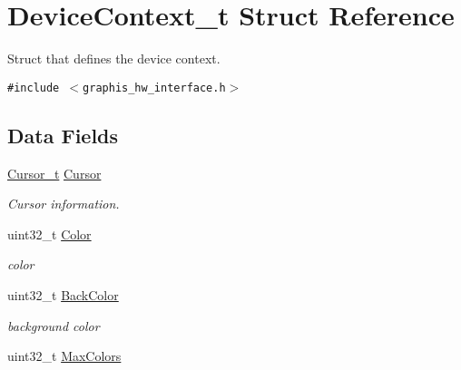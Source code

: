 \hypertarget{struct_device_context__t}{
\section{DeviceContext\_\-t Struct Reference}
\label{struct_device_context__t}
}
Struct that defines the device context.  


{\tt \#include $<$graphis\_\-hw\_\-interface.h$>$}

\subsection*{Data Fields}
\begin{CompactItemize}
\item 
\hypertarget{struct_device_context__t_8ebbb5616f53fe78cb656b842b251d3e}{
\hyperlink{struct_cursor__t}{Cursor\_\-t} \hyperlink{struct_device_context__t_8ebbb5616f53fe78cb656b842b251d3e}{Cursor}}
\label{struct_device_context__t_8ebbb5616f53fe78cb656b842b251d3e}

\begin{CompactList}\small\item\em Cursor information. \item\end{CompactList}\item 
\hypertarget{struct_device_context__t_22ec29d35b4dd0566a4ca177f2d8a657}{
uint32\_\-t \hyperlink{struct_device_context__t_22ec29d35b4dd0566a4ca177f2d8a657}{Color}}
\label{struct_device_context__t_22ec29d35b4dd0566a4ca177f2d8a657}

\begin{CompactList}\small\item\em color \item\end{CompactList}\item 
\hypertarget{struct_device_context__t_d4b3ed17969332ad9b42b7a73b3581a7}{
uint32\_\-t \hyperlink{struct_device_context__t_d4b3ed17969332ad9b42b7a73b3581a7}{BackColor}}
\label{struct_device_context__t_d4b3ed17969332ad9b42b7a73b3581a7}

\begin{CompactList}\small\item\em background color \item\end{CompactList}\item 
\hypertarget{struct_device_context__t_c002d7b99c89120315854044dc91dfbe}{
uint32\_\-t \hyperlink{struct_device_context__t_c002d7b99c89120315854044dc91dfbe}{MaxColors}}
\label{struct_device_context__t_c002d7b99c89120315854044dc91dfbe}


\end{CompactItemize}
